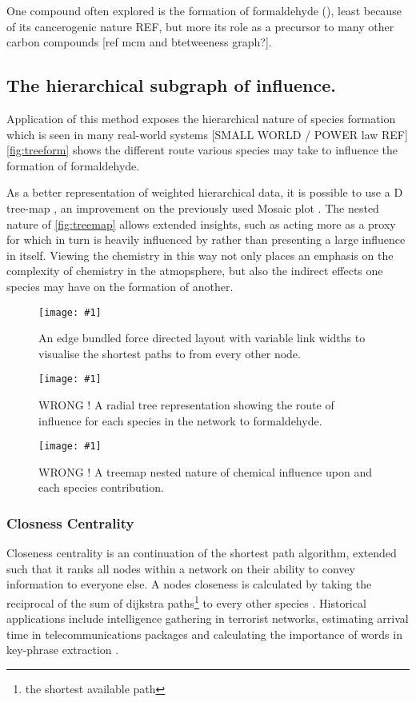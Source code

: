 \documentclass[twoside,reqno]{article}
\newcommand{\ch}[1]{\MakeUppercase{\ce{#1}}}  %
\newcommand{\qfig}[4]{\begin{figure}[H]\centering\texttt{[image: \#1]}\caption{#3}\label{#2}\end{figure}\newpage}
\begin{document}
One compound often explored is the formation of formaldehyde (\ch{hcho}), least because of its cancerogenic nature {REF}, but more its role as a precursor to many other carbon compounds [ref mcm and btetweeness graph?].\\

\subsection{The hierarchical subgraph of influence.}

Application of this method exposes the hierarchical nature of species formation which is seen in many real-world systems [SMALL WORLD / POWER law REF] \autoref{fig:treeform} shows the different route various species may take to influence the formation of formaldehyde.

As a better representation of weighted hierarchical data, it is possible to use a D tree-map \cite{treemap}, an improvement on the previously used Mosaic plot \cite{mosaic}. The nested nature of \autoref{fig:treemap} allows extended insights, such as \ch{ch3o2} acting more as a proxy for \ch{ch3co2h} which in turn is heavily influenced by \ch{ch3co3} rather than presenting a large influence in itself. Viewing the chemistry in this way not only places an emphasis on the complexity of chemistry in the atmopsphere, but also the
indirect effects one species may have on the formation of another.

\qfig{newfigs/ch2_distance.pdf}{fig:distance}{An edge bundled  force directed layout with variable link widths to visualise the shortest paths to \ch{HCHO} from every other node. }{\textwidth}


\qfig{figures/treeformation.pdf}{fig:treeform}{     WRONG ! A radial tree representation showing the route of influence for each species in the network to formaldehyde.}{\textwidth}


\qfig{figures/treemap.pdf}{fig:treemap}{WRONG ! A treemap nested nature of chemical influence upon \ch{hcho} and each species contribution.}{\textwidth}


\subsubsection{Closness Centrality}
Closeness centrality is an continuation of the shortest path algorithm, extended such that it ranks all nodes within a network on their ability to convey information to everyone else. A nodes closeness is calculated by taking the reciprocal of the sum of dijkstra paths\footnote{the shortest available path} to every other species \cite{closeness-book,closeness}. Historical applications include intelligence gathering in terrorist networks, estimating arrival time in telecommunications packages and calculating the importance of words in key-phrase extraction \cite{terror,examples_centrality,phrase}.
\end{document}

